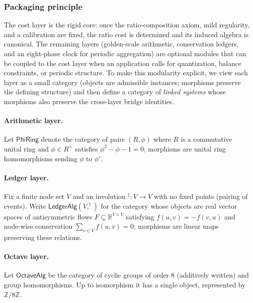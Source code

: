 \documentclass[11pt,reqno]{amsart}
\theoremstyle{plain}
\theoremstyle{definition}
\theoremstyle{remark}
\newcommand{\RR}{\mathbb{R}}
\newcommand{\ZZ}{\mathbb{Z}}
\newcommand{\1}{\mathbf{1}}
\begin{document}
\subsubsection*{Packaging principle}
The cost layer is the rigid core: once the ratio-composition axiom, mild regularity, and a calibration are fixed, the ratio cost is determined and its induced algebra is canonical.  The remaining layers (golden-scale arithmetic, conservation ledgers, and an eight-phase clock for periodic aggregation) are optional modules that can be coupled to the cost layer when an application calls for quantization, balance constraints, or periodic structure.  To make this modularity explicit, we view each layer as a small category (objects are admissible instances; morphisms preserve the defining structure) and then define a category of \emph{linked systems} whose morphisms also preserve the cross-layer bridge identities.

\paragraph{Arithmetic layer.}
Let $\mathsf{PhiRing}$ denote the category of pairs $(R,\phi)$ where $R$ is a commutative unital ring and $\phi\in R^\times$ satisfies $\phi^2-\phi-1=0$; morphisms are unital ring homomorphisms sending $\phi$ to $\phi'$.

\paragraph{Ledger layer.}
Fix a finite node set $V$ and an involution $^\dagger:V\to V$ with no fixed points (pairing of events).  Write $\mathsf{LedgerAlg}(V,^\dagger)$ for the category whose objects are real vector spaces of antisymmetric flows $F\subseteq \RR^{V\times V}$ satisfying $f(u,v)=-f(v,u)$ and node-wise conservation $\sum_{v\in V} f(u,v)=0$; morphisms are linear maps preserving these relations.

\paragraph{Octave layer.}
Let $\mathsf{OctaveAlg}$ be the category of cyclic groups of order $8$ (additively written) and group homomorphisms.  Up to isomorphism it has a single object, represented by $\ZZ/8\ZZ$.
\end{document}
